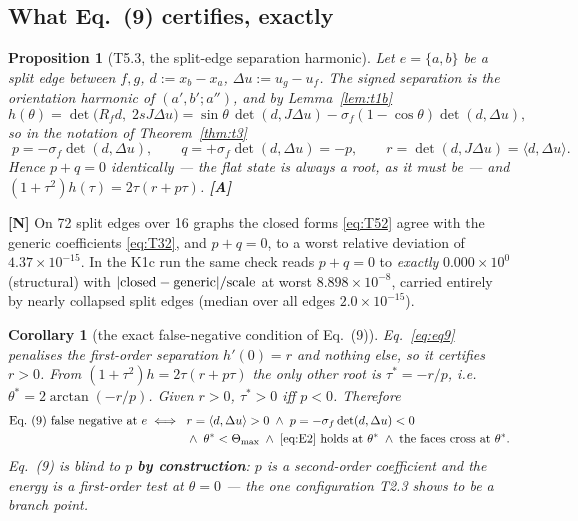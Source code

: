 \documentclass[11pt,a4paper]{article}
\newtheorem{proposition}[theorem]{Proposition}
\newtheorem{corollary}[theorem]{Corollary}
\theoremstyle{definition}
\newcommand{\Tmax}{\Theta_{\max}}
\begin{document}
\subsection{What Eq.~(9) certifies, exactly}
\label{sec:eq9}

\begin{proposition}[T5.3, the split-edge separation harmonic]
Let $e=\{a,b\}$ be a split edge between $f,g$, $d:=x_b-x_a$, $\Delta u := u_g-u_f$. The signed
separation is the orientation harmonic of $(a',b';a'')$, and by Lemma~\ref{lem:t1b}
\[
h(\theta) = \det\bigl(R_f d,\; 2sJ\Delta u\bigr)
= \sin\theta\,\det(d,J\Delta u) - \sigma_f(1-\cos\theta)\det(d,\Delta u),
\]
so in the notation of Theorem~\ref{thm:t3}
\begin{equation}
\boxed{\;p = -\sigma_f\det(d,\Delta u), \qquad q = +\sigma_f\det(d,\Delta u) = -p,
\qquad r = \det(d,J\Delta u) = \langle d,\Delta u\rangle .\;}
\label{eq:T52}
\end{equation}
Hence $p+q=0$ \emph{identically} --- the flat state is always a root, as it must be --- and
$(1+\tau^2)h(\tau) = 2\tau(r+p\tau)$. \textbf{[A]}
\end{proposition}
\noindent\textbf{[N]} On 72 split edges over 16 graphs the closed forms \eqref{eq:T52} agree
with the generic coefficients \eqref{eq:T32}, and $p+q=0$, to a worst relative deviation of
$4.37\times10^{-15}$. In the K1c run the same check reads $p+q=0$ to
\emph{exactly} $0.000\times10^{0}$ (structural) with $|{\rm closed}-{\rm generic}|/\mathrm{scale}$
at worst $8.898\times10^{-8}$, carried entirely by nearly collapsed split edges (median over
all edges $2.0\times10^{-15}$).

\begin{corollary}[the exact false-negative condition of Eq.~(9)]
Eq.~\eqref{eq:eq9} penalises the first-order separation $h'(0)=r$ and nothing else, so it
certifies $r>0$. From $(1+\tau^2)h=2\tau(r+p\tau)$ the \emph{only other} root is
$\tau^*=-r/p$, i.e.\ $\theta^*=2\arctan(-r/p)$. Given $r>0$, $\tau^*>0$ iff $p<0$. Therefore
\[
\begin{aligned}
\text{Eq.~(9) false negative at }e \iff\;\;
& r=\langle d,\Delta u\rangle>0 \;\wedge\; p=-\sigma_f\det(d,\Delta u)<0 \\
&\wedge\; \theta^*<\Tmax \;\wedge\; \text{\eqref{eq:E2} holds at }\theta^*
\;\wedge\; \text{the faces cross at }\theta^* .
\end{aligned}
\]
Eq.~(9) is blind to $p$ \textbf{by construction}: $p$ is a second-order coefficient and the
energy is a first-order test at $\theta=0$ --- the one configuration T2.3 shows to be a branch
point.
\end{corollary}
\end{document}
